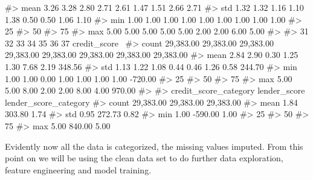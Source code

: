 \begin{Schunk}
\begin{Soutput}
#> mean       3.26      3.28      2.80      2.71      2.61      1.47      1.51      2.66      2.71   
#> std        1.32      1.32      1.16      1.10      1.38      0.50      0.50      1.06      1.10   
#> min        1.00      1.00      1.00      1.00      1.00      1.00      1.00      1.00      1.00   
#> 25%
#> 50%
#> 75%
#> max        5.00      5.00      5.00      5.00      5.00      2.00      2.00      6.00      5.00   
#> 
#>              31        32        33        34        35        36        37  credit_score  \
#> count 29,383.00 29,383.00 29,383.00 29,383.00 29,383.00 29,383.00 29,383.00     29,383.00   
#> mean       2.84      2.90      0.30      1.25      1.30      7.68      2.19        348.56   
#> std        1.13      1.22      1.08      0.44      0.46      1.26      0.58        244.70   
#> min        1.00      1.00      0.00      1.00      1.00      1.00      1.00       -720.00   
#> 25%
#> 50%
#> 75%
#> max        5.00      5.00      8.00      2.00      2.00      8.00      4.00        970.00   
#> 
#>        credit_score_category  lender_score  lender_score_category  
#> count              29,383.00     29,383.00              29,383.00  
#> mean                    1.84        303.80                   1.74  
#> std                     0.95        272.73                   0.82  
#> min                     1.00       -590.00                   1.00  
#> 25%
#> 50%
#> 75%
#> max                     5.00        840.00                   5.00
\end{Soutput}
\end{Schunk}

Evidently now all the data is categorized, the missing values imputed.
From this point on we will be using the clean data set to do further
data exploration, feature engineering and model training.

